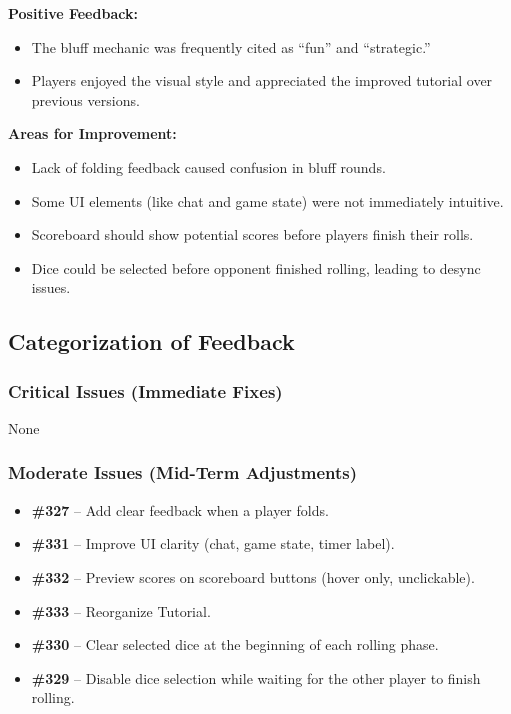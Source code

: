 \documentclass{article}
\begin{document}
\textbf{Positive Feedback:}
\begin{itemize}
    \item The bluff mechanic was frequently cited as “fun” and “strategic.”
    \item Players enjoyed the visual style and appreciated the improved tutorial over previous versions.
\end{itemize}

\textbf{Areas for Improvement:}
\begin{itemize}
    \item Lack of folding feedback caused confusion in bluff rounds.
    \item Some UI elements (like chat and game state) were not immediately intuitive.
    \item Scoreboard should show potential scores before players finish their rolls.
    \item Dice could be selected before opponent finished rolling, leading to desync issues.
\end{itemize}


\subsection{Categorization of Feedback}

\subsubsection{Critical Issues (Immediate Fixes)}
None

\subsubsection{Moderate Issues (Mid-Term Adjustments)}
\begin{itemize}
    \item \textbf{\#327} – Add clear feedback when a player folds.
    \item \textbf{\#331} – Improve UI clarity (chat, game state, timer label).
    \item \textbf{\#332} – Preview scores on scoreboard buttons (hover only, unclickable).
    \item \textbf{\#333} – Reorganize Tutorial.
    \item \textbf{\#330} – Clear selected dice at the beginning of each rolling phase.
    \item \textbf{\#329} – Disable dice selection while waiting for the other player to finish rolling.
\end{itemize}
\end{document}
